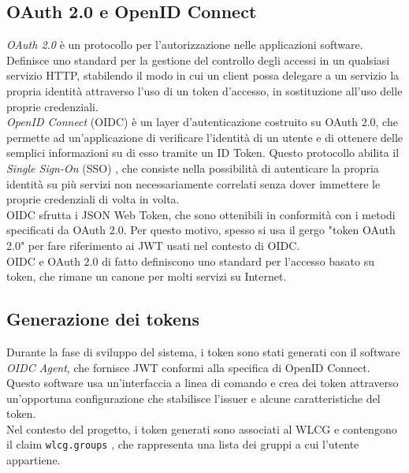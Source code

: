 \subsection{OAuth 2.0 e OpenID Connect}
\textit{OAuth 2.0} \cite{oauth_rfc} è un protocollo per l'autorizzazione nelle applicazioni software. Definisce uno standard per la gestione del controllo degli accessi
in un qualsiasi servizio HTTP, stabilendo il modo in cui un client possa delegare a un servizio la propria identità attraverso l'uso di un token d'accesso, in sostituzione all'uso delle proprie credenziali. 
\\ \textit{OpenID Connect} (OIDC) \cite{oidc_doc} è un layer d'autenticazione costruito su OAuth 2.0, che permette ad un'applicazione di 
verificare l'identità di un utente e di ottenere delle semplici informazioni su di esso tramite un ID Token. Questo protocollo abilita il \textit{Single Sign-On} (SSO) \cite{sso_doc}, 
che consiste nella possibilità di autenticare la propria identità su più servizi non necessariamente correlati senza dover immettere le proprie credenziali di volta in volta. 
\\OIDC sfrutta i JSON Web Token, che sono ottenibili in conformità con i metodi specificati da OAuth 2.0. Per questo motivo, spesso si usa il gergo
"token OAuth 2.0" per fare riferimento ai JWT usati nel contesto di OIDC.  
\\OIDC e OAuth 2.0 di fatto definiscono uno standard per l'accesso basato su token, che rimane un canone per molti servizi su Internet.

\subsection{Generazione dei tokens}
Durante la fase di sviluppo del sistema, i token sono stati generati con il software \textit{OIDC Agent}, che fornisce JWT conformi alla specifica di OpenID Connect.
Questo software usa un'interfaccia a linea di comando e crea dei token attraverso un'opportuna configurazione che stabilisce l'issuer e alcune caratteristiche del token.
\\ Nel contesto del progetto, i token generati sono associati al WLCG e contengono il claim \texttt{wlcg.groups} \cite{wlcg_jwt}, che rappresenta una lista dei gruppi a cui l'utente appartiene. 

